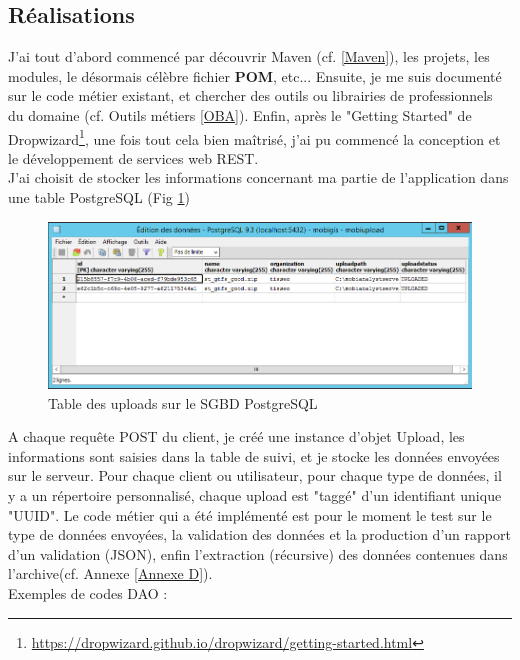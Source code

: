 \begin{itemize}
\subsection{Réalisations}

J'ai tout d'abord commencé par découvrir Maven (cf. \ref{Maven}), les projets, les modules, le désormais célèbre fichier \textbf{POM}, etc...
Ensuite, je me suis documenté sur le code métier existant, et chercher des outils ou librairies de professionnels du domaine (cf. Outils métiers \ref{OBA}).
Enfin, après le "Getting Started" de Dropwizard\footnote{\url{https://dropwizard.github.io/dropwizard/getting-started.html}}, une fois tout cela bien maîtrisé, j'ai pu  commencé la conception et le développement de services web REST.\\

J'ai choisit de stocker les informations concernant ma partie de l'application dans une table PostgreSQL (Fig \ref{TablePostgres})\\
\begin{figure}[!h]
\centering
\includegraphics[width=14cm]{images/tablePostgres_mobiupload_small.png}
\caption{\label{TablePostgres}Table des uploads sur le SGBD PostgreSQL}
\end{figure} 

A chaque requête POST du client, je créé une instance d'objet Upload, les informations sont saisies dans la table de suivi, et je stocke les données envoyées sur le serveur. Pour chaque client ou utilisateur, pour chaque type de données, il y a un répertoire personnalisé, chaque upload est "taggé" d'un identifiant unique "UUID".
Le code métier qui a été implémenté est pour le moment le test sur le type de données envoyées, la validation des données et la production d'un rapport d'un validation (JSON), enfin l'extraction (récursive) des données contenues dans l'archive(cf. Annexe \ref{Annexe D}).\\


Exemples de codes DAO :


\end{itemize}

